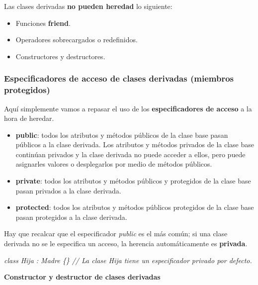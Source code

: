 Las clases derivadas \textbf{no pueden heredad} lo siguiente:
\begin{itemize}
    \item Funciones \textbf{friend}.
    \item Operadores sobrecargados o redefinidos.
    \item Constructores y destructores.
\end{itemize}


\subsubsection{Especificadores de acceso de clases derivadas (miembros protegidos)}
\hspace{0.55cm}Aquí simplemente vamos a repasar el uso de los \textbf{especificadores de acceso} a la hora de heredar.
\begin{itemize}
    \item \textbf{public}: todos los atributos y métodos públicos de la clase base pasan públicos a la clase derivada. Los atributos y métodos privados de la clase base continúan privados y la clase derivada no puede acceder a ellos, pero puede asignarles valores o desplegarlos por medio de métodos públicos.
    \item \textbf{private}: todos los atributos y métodos públicos y protegidos de la clase base pasan privados a la clase derivada.
    \item \textbf{protected}: todos los atributos y métodos públicos protegidos de la clase base pasan protegidos a la clase derivada.
\end{itemize}

Hay que recalcar que el especificador \textit{public} es el más común; si una clase derivada no se le especifica un acceso, la herencia automáticamente es \textbf{privada}.
\begin{center}
    \textit{class Hija : Madre \{\} // La clase Hija tiene un especificador privado por defecto.}
\end{center}

\textbf{Constructor y destructor de clases derivadas}

